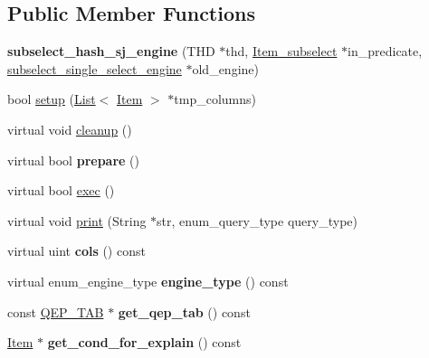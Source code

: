 \subsection*{Public Member Functions}
\begin{DoxyCompactItemize}
\item 
\mbox{\label{classsubselect__hash__sj__engine_ae8f557b225efe1b3e56190a2176ae6e9}} 
{\bfseries subselect\+\_\+hash\+\_\+sj\+\_\+engine} (T\+HD $\ast$thd, \mbox{\hyperlink{classItem__subselect}{Item\+\_\+subselect}} $\ast$in\+\_\+predicate, \mbox{\hyperlink{classsubselect__single__select__engine}{subselect\+\_\+single\+\_\+select\+\_\+engine}} $\ast$old\+\_\+engine)
\item 
bool \mbox{\hyperlink{classsubselect__hash__sj__engine_af8a5ad2eafdc200158334f926434ccda}{setup}} (\mbox{\hyperlink{classList}{List}}$<$ \mbox{\hyperlink{classItem}{Item}} $>$ $\ast$tmp\+\_\+columns)
\item 
virtual void \mbox{\hyperlink{classsubselect__hash__sj__engine_a2543ad3f7c4cd6ab5e774d6c4eb9ef64}{cleanup}} ()
\item 
\mbox{\label{classsubselect__hash__sj__engine_a2b4f9425771780d9a02583c75091fe18}} 
virtual bool {\bfseries prepare} ()
\item 
virtual bool \mbox{\hyperlink{classsubselect__hash__sj__engine_a96da55efcf5b1945df7d53dcc41d6499}{exec}} ()
\item 
virtual void \mbox{\hyperlink{classsubselect__hash__sj__engine_a5bf7f2070358f915ec2d959cd4bad4fa}{print}} (String $\ast$str, enum\+\_\+query\+\_\+type query\+\_\+type)
\item 
\mbox{\label{classsubselect__hash__sj__engine_acf3655fa59fe03b1c3489087d98e6cfc}} 
virtual uint {\bfseries cols} () const
\item 
\mbox{\label{classsubselect__hash__sj__engine_adba821a697b1e782fcd3d418f5a797b4}} 
virtual enum\+\_\+engine\+\_\+type {\bfseries engine\+\_\+type} () const
\item 
\mbox{\label{classsubselect__hash__sj__engine_a1a39d9ec40b34425583929694beead72}} 
const \mbox{\hyperlink{classQEP__TAB}{Q\+E\+P\+\_\+\+T\+AB}} $\ast$ {\bfseries get\+\_\+qep\+\_\+tab} () const
\item 
\mbox{\label{classsubselect__hash__sj__engine_aa2ad60804a6ea70dc80fe54e9b41a6bb}} 
\mbox{\hyperlink{classItem}{Item}} $\ast$ {\bfseries get\+\_\+cond\+\_\+for\+\_\+explain} () const
\end{DoxyCompactItemize}
